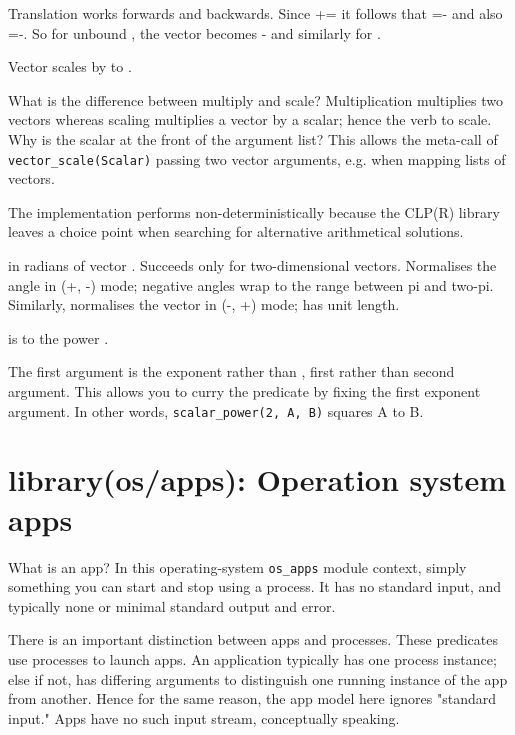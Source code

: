 \begin{description}
Translation works forwards and backwards. Since += it follows
that =- and also =-. So for unbound , the vector becomes -
and similarly for .

Vector  scales by  to .

What is the difference between multiply and scale? Multiplication
multiplies two vectors whereas scaling multiplies a vector by a
scalar; hence the verb to scale. Why is the scalar at the front of
the argument list? This allows the meta-call of \verb$vector_scale(Scalar)$
passing two vector arguments, e.g. when mapping lists of vectors.

The implementation performs non-deterministically because the CLP(R)
library leaves a choice point when searching for alternative
arithmetical solutions.

 in radians of vector . Succeeds only for two-dimensional
vectors. Normalises the  angle in (+, -) mode; negative
angles wrap to the range between pi and two-pi. Similarly,
normalises the vector  in (-, +) mode;  has unit length.

 is  to the power .

The first argument  is the exponent rather than , first rather
than second argument. This allows you to curry the predicate by
fixing the first exponent argument. In other words, \verb$scalar_power(2, A, B)$ squares A to B.
\end{description}

\chapter{library(os/apps): Operation system apps}\label{sec:apps}

What is an app? In this operating-system \verb$os_apps$ module context,
simply something you can start and stop using a process. It has no
standard input, and typically none or minimal standard output and
error.

There is an important distinction between apps and processes. These
predicates use processes to launch apps. An application typically has
one process instance; else if not, has differing arguments to
distinguish one running instance of the app from another. Hence for
the same reason, the app model here ignores "standard input." Apps
have no such input stream, conceptually speaking.

